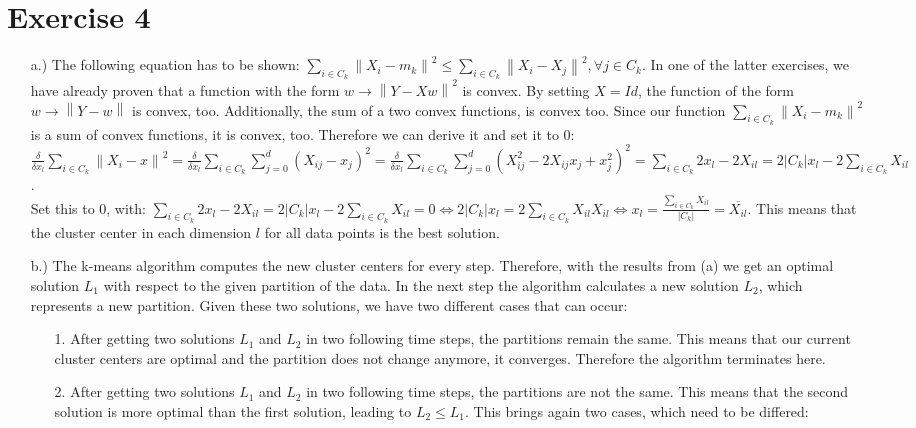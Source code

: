 \documentclass[%
   10pt,              %
   a4paper,           %
   DIV10,             %
]{scrartcl}%
\newcommand{\norm}[1]{\left\lVert#1\right\rVert}
\begin{document}
\section*{Exercise 4}
\begin{itemize}
	\item[a.)] The following equation has to be shown: $\sum_{i \in C_k} \norm{X_i - m_k}^2 \leq \sum_{i \in C_k} \norm{X_i - X_j}^2, \forall j \in C_k$. In one of the latter exercises, we have already proven that a function with the form $w \rightarrow \norm{Y - Xw}^2$ is convex. By setting $X = Id$, the function of the form $w \rightarrow \norm{Y - w}$ is convex, too. Additionally, the sum of a two convex functions, is convex too. Since our function $\sum_{i \in C_k} \norm{X_i - m_k}^2$ is a sum of convex functions, it is convex, too. Therefore we can derive it and set it to 0:\\
	$\frac{\delta}{\delta x_l} \sum_{i \in C_k} \norm{X_i - x}^2 = \frac{\delta}{\delta x_l} \sum_{i \in C_k} \sum_{j = 0}^{d} (X_{ij} - x_j)^2 = \frac{\delta}{\delta x_l} \sum_{i \in C_k} \sum_{j = 0}^{d} (X_{ij}^2 - 2 X_{ij}x_j + x_j^2)^2 = \sum_{i \in C_k} 2x_l - 2X_{il} = 2 |C_k|x_l- 2 \sum_{i \in C_k} X_{il}$.\\
	Set this to 0, with: $\sum_{i \in C_k} 2x_l - 2X_{il} = 2 |C_k|x_l- 2 \sum_{i \in C_k} X_{il} = 0 \Leftrightarrow 2 |C_k|x_l = 2\sum_{i \in C_k} X_{il} X_{il} \Leftrightarrow x_l = \frac{\sum_{i \in C_k} X_{il}}{|C_k|} = \overline{X_{il}}$. This means that the cluster center in each dimension $l$ for all data points is the best solution. 
	\item[b.)] The k-means algorithm computes the new cluster centers for every step. Therefore, with the results from (a) we get an optimal solution $L_1$ with respect to the given partition of the data. In the next step the algorithm calculates a new solution $L_2$, which represents a new partition. Given these two solutions, we have two different cases that can occur: 
	\begin{enumerate}
		\item[1.] After getting two solutions $L_1$ and $L_2$ in two following time steps, the partitions remain the same. This means that our current cluster centers are optimal and the partition does not change anymore, it converges. Therefore the algorithm terminates here.
		\item[2.] After getting two solutions $L_1$ and $L_2$ in two following time steps, the partitions are not the same. This means that the second solution is more optimal than the first solution, leading to $L_2 \leq L_1$. This brings again two cases, which need to be differed: 

\end{enumerate}
\end{itemize}
\end{document}
